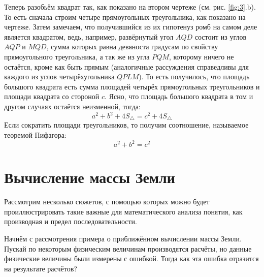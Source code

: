 \documentclass[titlepage]{article}
\begin{document}
\par
Теперь разобьём квадрат так, как показано на втором чертеже (см. рис. \ref{fig:3}.b). То есть сначала строим четыре прямоугольных треугольника, как показано на чертеже. Затем замечаем, что получившийся из их гипотенуз ромб на самом деле является квадратом, ведь, например, развёрнутый угол $AQD$ состоит из углов $AQP$ и $MQD$, сумма которых равна девяноста градусам по свойству прямоугольного треугольника, а так же из угла $PQM$, которому ничего не остаётся, кроме как быть прямым (аналогичные рассуждения справедливы для каждого из углов четырёхугольника $QPLM$). То есть получилось, что площадь большого квадрата есть сумма площадей четырёх прямоугольных треугольников и площади квадрата со стороной $c$. Ясно, что площадь большого квадрата в том и другом случаях остаётся неизменной, тогда:
\begin{equation}
 a^2 + b^2 + 4S_\triangle=c^2+4S_\triangle
\end{equation}
Если сократить площади треугольников, то получим соотношение, называемое теоремой Пифагора:
\begin{equation}
 a^2 + b^2 =c^2
\end{equation}

\section{Вычисление массы Земли}
Рассмотрим несколько сюжетов, с помощью которых можно будет проиллюстрировать такие важные для математического анализа понятия, как производная и предел последовательности. 

\par
Начнём с рассмотрения примера о приближённом вычислении массы Земли. Пускай по некоторым физическим величинам производятся расчёты, но данные физические величины были измерены с ошибкой. Тогда как эта ошибка отразится на результате расчётов?
\end{document}
